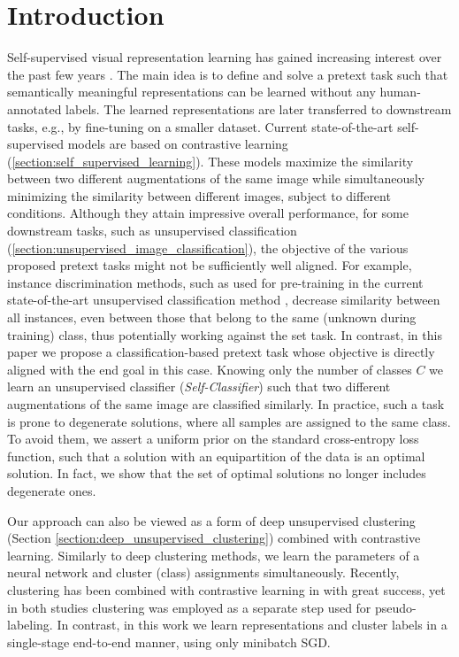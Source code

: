 \documentclass[runningheads]{llncs}
\begin{document}
\section{Introduction}
Self-supervised visual representation learning has gained increasing interest over the past few years \cite{wu2018unsupervised,dosovitskiy2014discriminative,DBLP:journals/corr/abs-2002-05709,chen2020big,he2020momentum,chen2020improved,caron2020unsupervised,misra2020self}. The main idea is to define and solve a pretext task such that semantically meaningful representations can be learned without any human-annotated labels. The learned representations are later transferred to downstream tasks, e.g., by fine-tuning on a smaller dataset. Current state-of-the-art self-supervised models are based on contrastive learning (\cref{section:self_supervised_learning}). These models maximize the similarity between two different augmentations of the same image while simultaneously minimizing the similarity between different images, subject to different conditions.
Although they attain impressive overall performance, for some downstream tasks, such as unsupervised classification (\cref{section:unsupervised_image_classification}), the objective of the various proposed pretext tasks might not be sufficiently well aligned. For example, instance discrimination methods, such as \cite{he2020momentum,chen2020improved} used for pre-training in the current state-of-the-art unsupervised classification method \cite{van2020scan}, decrease similarity between all instances, even between those that belong to the same (unknown during training) class, thus potentially working against the set task. In contrast, in this paper we propose a classification-based pretext task whose objective is directly aligned with the end goal in this case.
Knowing only the number of classes $C$ we learn an unsupervised classifier (\textit{Self-Classifier}) such that two different augmentations of the same image are classified similarly. In practice, such a task is prone to degenerate solutions, where all samples are assigned to the same class. To avoid them, we assert a uniform prior on the standard cross-entropy loss function, such that a solution with an equipartition of the data is an optimal solution. In fact, we show that the set of optimal solutions no longer includes degenerate ones. 

Our approach can also be viewed as a form of deep unsupervised clustering (Section \ref{section:deep_unsupervised_clustering}) \cite{xie2016unsupervised,yang2016joint,chang2017deep,caron2018deep,haeusser2018associative,ji2019invariant,van2020scan,YM.2020Self-labelling} combined with contrastive learning. Similarly to deep clustering methods, we learn the parameters of a neural network and cluster (class) assignments simultaneously. Recently, clustering has been combined with contrastive learning in \cite{YM.2020Self-labelling,caron2020unsupervised} with great success, yet in both studies clustering was employed as a separate step used for pseudo-labeling. In contrast, in this work we learn representations and cluster labels in a single-stage end-to-end manner, using only minibatch SGD.
\end{document}
